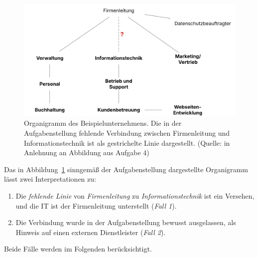 \begin{figure}
\centering
\includegraphics[scale=0.4]{aufgabe 4/img/organigramm.svg}
\caption{Organigramm des Beispielunternehmens. Die in der Aufgabenstellung fehlende Verbindung zwischen Firmenleitung und Informationstechnik ist als gestrichelte Linie dargestellt. (Quelle: in Anlehnung an Abbildung aus Aufgabe 4)}
\label{fig:organigramm}
\end{figure}

\noindent
Das in Abbildung~\ref{fig:organigramm} sinngemäß der Aufgabenstellung dargestellte Organigramm lässt zwei Interpretationen zu:
\begin{enumerate}
\itemsep0.5em
\item Die \textit{fehlende Linie} von \textit{Firmenleitung} zu \textit{Informationstechnik} ist ein Versehen, und die IT ist der Firmenleitung unterstellt (\textit{Fall 1}).
\item Die Verbindung wurde in der Aufgabenstellung bewusst ausgelassen, als Hinweis auf einen externen Dienstleister (\textit{Fall 2}).
\end{enumerate}

\noindent
Beide Fälle werden im Folgenden berücksichtigt.

